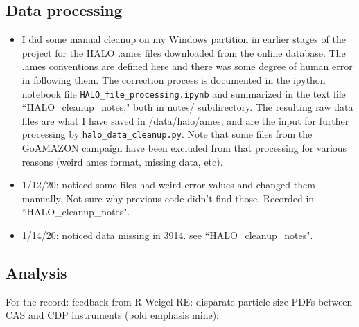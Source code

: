 \documentclass{article}
\begin{document}
\subsection{Data processing}
\begin{itemize}
	\item I did some manual cleanup on my Windows partition in earlier stages of the project for the HALO .ames files downloaded from the online database. The .ames conventions are defined \href{http://artefacts.ceda.ac.uk/formats/NASA-Ames/na-brief-guide.html}{here} and there was some degree of human error in following them. The correction process is documented in the ipython notebook file \texttt{HALO\_file\_processing.ipynb} and summarized in the text file ``HALO\_cleanup\_notes," both in notes/ subdirectory. The resulting raw data files are what I have saved in /data/halo/ames, and are the input for further processing by \texttt{halo\_data\_cleanup.py}. Note that some files from the GoAMAZON campaign have been excluded from that processing for various reasons (weird ames format, missing data, etc).
	\item 1/12/20: noticed some files had weird error values and changed them manually. Not sure why previous code didn't find those. Recorded in ``HALO\_cleanup\_notes".
	\item 1/14/20: noticed data missing in 3914. see ``HALO\_cleanup\_notes".
\end{itemize}

\subsection{Analysis}
For the record: feedback from R Weigel RE: disparate particle size PDFs between CAS and CDP instruments (bold emphasis mine):
\end{document}
